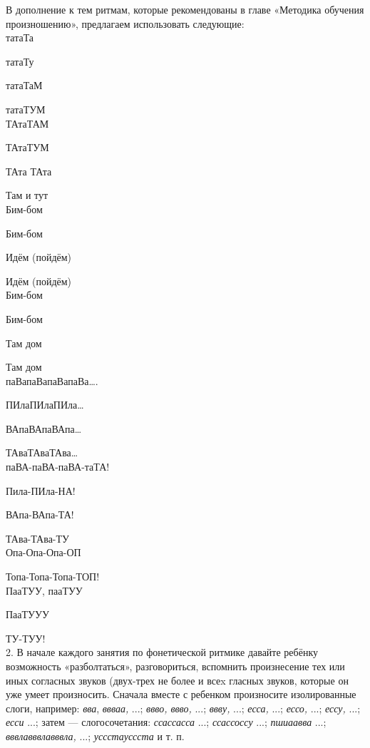 \documentclass[a5paper]{book}
\renewcommand{\emph}[1]{\textit{#1}}
\begin{document}
В дополнение к тем ритмам, которые рекомендованы в главе «Методика
обучения произношению», предлагаем использовать следующие: \\


татаТа

татаТу

татаТаМ

татаТУМ \\

ТАтаТАМ

ТАтаТУМ

ТАта ТАта

Там и тут \\

Бим-бом

Бим-бом

Идём (пойдём)

Идём (пойдём) \\

Бим-бом

Бим-бом

Там дом

Там дом \\

паВапаВапаВапаВа\ldots.

ПИлаПИлаПИла\ldots{}

ВАпаВАпаВАпа\ldots{}

ТАваТАваТАва\ldots{} \\

паВА-паВА-паВА-таТА!

Пила-ПИла-НА!

ВАпа-ВАпа-ТА!

ТАва-ТАва-ТУ \\

Опа-Опа-Опа-ОП

Топа-Топа-Топа-ТОП! \\

ПааТУУ, пааТУУ

ПааТУУУ

ТУ-ТУУ! \\


2. В начале каждого занятия по фонетической ритмике давайте ребёнку
возможность «разболтаться», разговориться, вспомнить произнесение тех
или иных согласных звуков (двух-трех не более и всеx гласных звуков,
которые он уже умеет произносить. Сначала вместе с ребенком произносите
изолированные слоги, например: \emph{вва}, \emph{ввваа,} ...;
\emph{ввво, ввво,} ...; \emph{ввву,} ...; \emph{есса,} ...; \emph{ессо,}
...; \emph{ессу,} ...; \emph{есси} ...; затем --- слогосочетания:
\emph{ссассасса} ...; \emph{ссассоссу} ...; \emph{пшиаавва} ...;
\emph{вввлавввлавввла,} ...; \emph{уссстауссста} и т. п.
\end{document}
